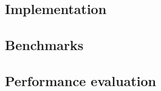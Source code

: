 \subsection{\CO}

\subsection{Implementation}


\subsection{Benchmarks}

\subsection{Performance evaluation}

